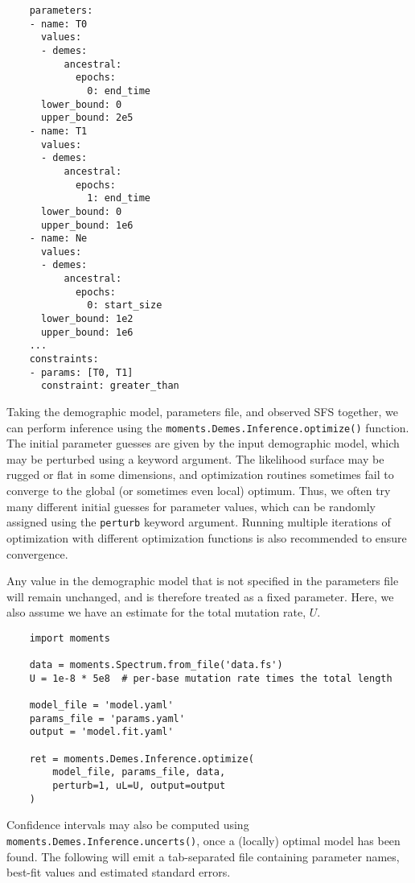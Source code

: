 \documentclass[]{article}
\begin{document}
\singlespacing
\begin{verbatim}
    parameters:
    - name: T0
      values:
      - demes:
          ancestral:
            epochs:
              0: end_time
      lower_bound: 0
      upper_bound: 2e5
    - name: T1
      values:
      - demes:
          ancestral:
            epochs:
              1: end_time
      lower_bound: 0
      upper_bound: 1e6
    - name: Ne
      values:
      - demes:
          ancestral:
            epochs:
              0: start_size
      lower_bound: 1e2
      upper_bound: 1e6
    ...
    constraints:
    - params: [T0, T1]
      constraint: greater_than
\end{verbatim}
\doublespacing

Taking the demographic model, parameters file, and observed SFS together, we
can perform inference using the \texttt{moments.Demes.Inference.optimize()}
function. The initial parameter guesses are given by the input demographic
model, which may be perturbed using a keyword argument. The likelihood surface
may be rugged or flat in some dimensions, and optimization routines sometimes
fail to converge to the global (or sometimes even local) optimum. Thus, we
often try many different initial guesses for parameter values, which can be
randomly assigned using the \texttt{perturb} keyword argument. Running multiple
iterations of optimization with different optimization functions is also
recommended to ensure convergence.

Any value in the demographic model that is not specified in the parameters file
will remain unchanged, and is therefore treated as a fixed parameter. Here, we
also assume we have an estimate for the total mutation rate, $U$.

\singlespacing
\begin{verbatim}
    import moments 

    data = moments.Spectrum.from_file('data.fs')
    U = 1e-8 * 5e8  # per-base mutation rate times the total length

    model_file = 'model.yaml'
    params_file = 'params.yaml'
    output = 'model.fit.yaml'

    ret = moments.Demes.Inference.optimize(
        model_file, params_file, data,
        perturb=1, uL=U, output=output
    )
\end{verbatim}
\doublespacing

Confidence intervals may also be computed using
\texttt{moments.Demes.Inference.uncerts()}, once a (locally) optimal model has
been found. The following will emit a tab-separated file containing parameter
names, best-fit values and estimated standard errors.
\end{document}
